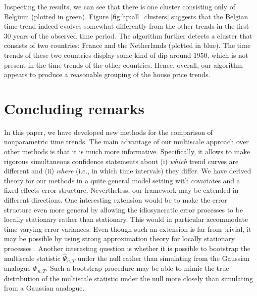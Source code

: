 \documentclass[12pt]{article}
\begin{document}
Inspecting the results, we can see that there is one cluster consisting only of Belgium (plotted in green). Figure \ref{fig:hp:all_clusters} suggests that the Belgian time trend indeed evolves somewhat differently from the other trends in the first $30$ years of the observed time period. %
The algorithm further detects a cluster that consists of two countries: France and the Netherlands (plotted in blue). The time trends of these two countries display some kind of dip around 1950, which is not present in the time trends of the other countries. 
Hence, overall, our algorithm appears to produce a reasonable grouping of the house price trends.



\section{Concluding remarks}


In this paper, we have developed new methods for the comparison of nonparametric time trends. The main advantage of our multiscale approach over other methods is that it is much more informative. Specifically, it allows to make rigorous simultaneous confidence statements about (i) \textit{which} trend curves are different and (ii) \textit{where} (i.e., in which time intervals) they differ. We have derived theory for our methods in a quite general model setting with covariates and a fixed effects error structure. Nevertheless, our framework may be extended in different directions. One interesting extension would be to make the error structure even more general by allowing the idiosyncratic error processes to be locally stationary rather than stationary. This would in particular accommodate time-varying error variances. Even though such an extension is far from trivial, it may be possible by using strong approximation theory for locally stationary processes \citep[][]{WuZhou2011}. Another interesting question is whether it is possible to bootstrap the multiscale statistic $\widehat{\Psi}_{n,T}$ under the null rather than simulating from the Gaussian analogue $\Phi_{n,T}$. Such a bootstrap procedure may be able to mimic the true distribution of the multiscale statistic under the null more closely than simulating from a Gaussian analogue.  




{\small
\setlength{\bibsep}{0.6em}
}
\end{document}
